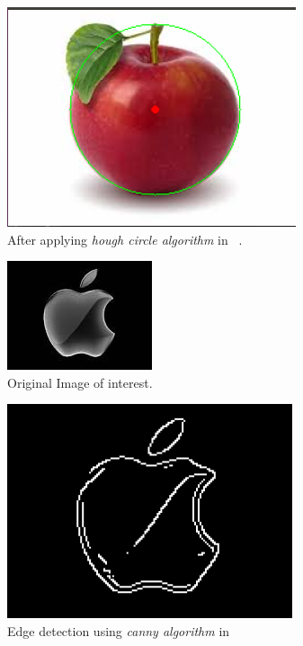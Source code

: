 \documentclass[letterpaper, 12 pt, conference ,onecolumn]{ieeeconf}  %
\begin{document}
\begin{figure}[h!]
\includegraphics[width=0.4\paperwidth]{hough-circles/apple2-circles.png}
\caption{After applying \textit{hough circle algorithm} in ~.}
\label{fig:apple2-circles}
\end{figure}

\begin{figure}[h!]
\includegraphics[width=0.4\paperwidth]{hough-circles/Apple1.jpg}
\caption{Original Image of interest.}
\label{fig:apple1}
\end{figure}

\begin{figure}[h!]
\includegraphics[width=0.4\paperwidth]{hough-circles/apple-canny.jpg}
\caption{Edge detection using \textit{canny algorithm} in ~}
\label{fig:apple1-canny}
\end{figure}
\end{document}
